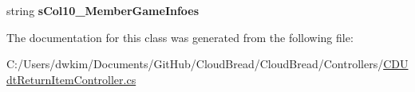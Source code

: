 \begin{DoxyCompactItemize}
\item 
string {\bfseries s\+Col10\+\_\+\+Member\+Game\+Infoes}\hypertarget{class_cloud_bread_1_1_controllers_1_1_c_b_udt_return_item_controller_1_1_input_params_a91997d73f9030008791bdaadc483d556}{}\label{class_cloud_bread_1_1_controllers_1_1_c_b_udt_return_item_controller_1_1_input_params_a91997d73f9030008791bdaadc483d556}

\end{DoxyCompactItemize}


The documentation for this class was generated from the following file\+:\begin{DoxyCompactItemize}
\item 
C\+:/\+Users/dwkim/\+Documents/\+Git\+Hub/\+Cloud\+Bread/\+Cloud\+Bread/\+Controllers/\hyperlink{_c_d_udt_return_item_controller_8cs}{C\+D\+Udt\+Return\+Item\+Controller.\+cs}\end{DoxyCompactItemize}
